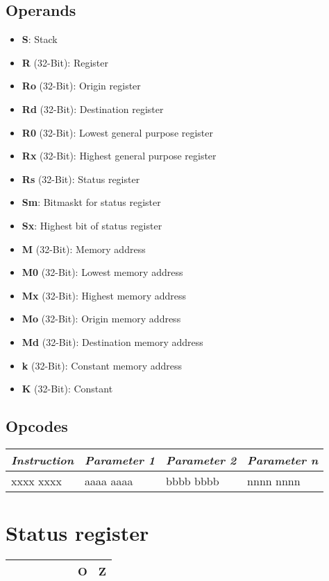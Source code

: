 \documentclass[titlepage]{scrartcl}
\begin{document}
\subsection{Operands}
\begin{itemize}
	\item \textbf{S}: Stack
	\item \textbf{R} (32-Bit): Register
	\item \textbf{Ro} (32-Bit): Origin register
	\item \textbf{Rd} (32-Bit): Destination register
	\item \textbf{R0} (32-Bit): Lowest general purpose register
	\item \textbf{Rx} (32-Bit): Highest general purpose register \vspace{1ex}
	\item \textbf{Rs} (32-Bit): Status register
	\item \textbf{Sm}: Bitmaskt for status register
	\item \textbf{Sx}: Highest bit of status register \vspace{1ex}
	\item \textbf{M} (32-Bit): Memory address
	\item \textbf{M0} (32-Bit): Lowest memory address
	\item \textbf{Mx} (32-Bit): Highest memory address
	\item \textbf{Mo} (32-Bit): Origin memory address
	\item \textbf{Md} (32-Bit): Destination memory address
	\item \textbf{k} (32-Bit): Constant memory address \vspace{1ex}
	\item \textbf{K} (32-Bit): Constant
\end{itemize}
\subsection{Opcodes}
\begin{tabularx}{\textwidth}{|Y|Y|Y|Y|}
	\hline
	\itshape{Instruction} & \itshape{Parameter 1} & \itshape{Parameter 2} & \itshape{Parameter n} \\
	\hline
	xxxx xxxx             & aaaa aaaa             & bbbb bbbb             & nnnn nnnn             \\
	\hline
\end{tabularx}
\newpage

\section{Status register}
\begin{tabularx}{\textwidth}{|Y|Y|Y|Y|Y|Y|Y|Y|}
	\hline
	 &  &  &  &  &  & \textbf{O} & \textbf{Z} \\
	\hline
\end{tabularx}
\end{document}
